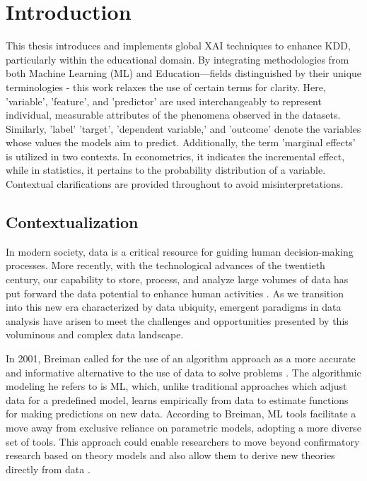 \chapter{Introduction}
\label{contextualizacao}
This thesis introduces and implements global \gls{XAI} techniques to enhance \gls{KDD}, particularly within the educational domain. By integrating methodologies from both Machine Learning (ML) and Education—fields distinguished by their unique terminologies - this work relaxes the use of certain terms for clarity. Here, 'variable', 'feature', and 'predictor' are used interchangeably to represent individual, measurable attributes of the phenomena observed in the datasets. Similarly, 'label' 'target', 'dependent variable,' and 'outcome' denote the variables whose values the models aim to predict. Additionally, the term 'marginal effects' is utilized in two contexts. In econometrics, it indicates the incremental effect, while in statistics, it pertains to the probability distribution of a variable. Contextual clarifications are provided throughout to avoid misinterpretations.

\section{Contextualization}

In modern society, data is a critical resource for guiding human decision-making processes. More recently, with the technological advances of the twentieth century, our capability to store, process, and analyze large volumes of data has put forward the data potential to enhance human activities \cite{Provost2013DataMaking}. As we transition into this new era characterized by data ubiquity, emergent paradigms in data analysis have arisen to meet the challenges and opportunities presented by this voluminous and complex data landscape. 

In 2001, Breiman called for the use of an algorithm approach as a more accurate and informative alternative to the use of data to solve problems \cite{Breiman2001StatisticalAuthor}. The algorithmic modeling he refers to is ML, which, unlike traditional approaches which adjust data for a predefined model, learns empirically from data to estimate functions for making predictions on new data. According to Breiman, ML tools facilitate a move away from exclusive reliance on parametric models, adopting a more diverse set of tools. This approach could enable researchers to move beyond confirmatory research based on theory models and also allow them to derive new theories directly from data \cite{Molina2019AnnualSociology}.

